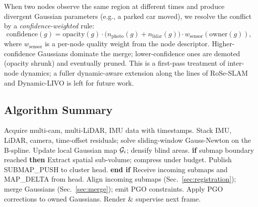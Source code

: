When two nodes observe the same region at different times and produce
divergent Gaussian parameters (e.g., a parked car moved), we resolve the
conflict by a \emph{confidence-weighted} rule:
\begin{equation}
  \text{confidence}(g) = \text{opacity}(g) \cdot \bigl(n_{\text{photo}}(g) + n_{\text{lidar}}(g)\bigr) \cdot w_{\text{sensor}}(\text{owner}(g)),
\end{equation}
where $w_{\text{sensor}}$ is a per-node quality weight from the node
descriptor. Higher-confidence Gaussians dominate the merge; lower-confidence
ones are demoted (opacity shrunk) and eventually pruned. This is a
first-pass treatment of inter-node dynamics; a fuller dynamic-aware extension
along the lines of RoSe-SLAM \cite{wang2026roseslam} and Dynamic-LIVO
\cite{zhang2026dynamiclivo} is left for future work.

\subsection{Algorithm Summary}

\begin{algorithm}[t]
\caption{Per-node cooperative loop (one iteration).}
\label{alg:coop}
\begin{algorithmic}[1]
\State Acquire multi-cam, multi-LiDAR, IMU data with timestamps.
\State Stack IMU, LiDAR, camera, time-offset residuals; solve sliding-window
       Gauss-Newton on the B-spline. 
\State Update local Gaussian map $\mathcal{G}_i$; densify blind areas.
\State \textbf{if} submap boundary reached \textbf{then}
  \State \quad Extract spatial sub-volume; compress under budget.
  \State \quad Publish SUBMAP\_PUSH to cluster head.
\State \textbf{end if}
\State Receive incoming submaps and MAP\_DELTA from head.
\State Align incoming submaps (Sec.~\ref{sec:registration}); merge
       Gaussians (Sec.~\ref{sec:merge}); emit PGO constraints.
\State Apply PGO corrections to owned Gaussians.
\State Render \& supervise next frame.
\end{algorithmic}
\end{algorithm}
